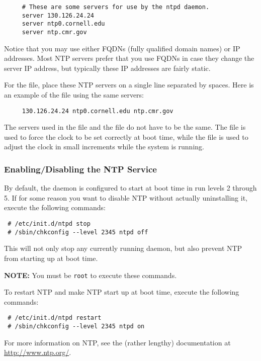 \begin{verbatim}
     # These are some servers for use by the ntpd daemon.
     server 130.126.24.24
     server ntp0.cornell.edu
     server ntp.cmr.gov
\end{verbatim}

Notice that you may use either FQDNs (fully qualified domain names) or
IP addresses.  Most NTP servers prefer that you use FQDNs in case they
change the server IP address, but typically these IP addresses are
fairly static.

For the  file, place these NTP servers on
a single line separated by spaces.  Here is an example of the
 file using the same servers:

\begin{verbatim}
     130.126.24.24 ntp0.cornell.edu ntp.cmr.gov
\end{verbatim}

The servers used in the  file and the
 file do not have to be the same.  The
 file is used to force the clock to be set
correctly at boot time, while the  file is used to
adjust the clock in small increments while the system is running.

\subsubsection{Enabling/Disabling the NTP Service}

By default, the  daemon is configured to start at boot time
in run levels 2 through 5.  If for some reason you want to disable NTP
without actually uninstalling it, execute the following commands:

\begin{verbatim}
 # /etc/init.d/ntpd stop
 # /sbin/chkconfig --level 2345 ntpd off
\end{verbatim}

This will not only stop any currently running  daemon, but
also prevent NTP from starting up at boot time.

\bigskip 

{\bf NOTE:} You must be {\tt root} to execute these commands.

\bigskip 

To restart NTP and make NTP start up at boot time, execute the following
commands:

\begin{verbatim}
 # /etc/init.d/ntpd restart
 # /sbin/chkconfig --level 2345 ntpd on
\end{verbatim}

For more information on NTP, see the (rather lengthy) documentation at
\url{http://www.ntp.org/}.


